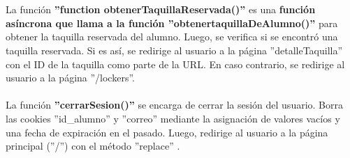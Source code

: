 \documentclass[12pt]{report}
\begin{document}
\\\\
La función \textbf{''function obtenerTaquillaReservada()''} es una \textbf{función asíncrona que llama a la función ''obtenertaquillaDeAlumno()''} para obtener la taquilla reservada del alumno. Luego, se verifica si se encontró una taquilla reservada. Si es así, se redirige al usuario a la página ''detalleTaquilla'' con el ID de la taquilla como parte de la URL. En caso contrario, se redirige al usuario a la página ''/lockers''.
\\\\
La función \textbf{''cerrarSesion()''} se encarga de cerrar la sesión del usuario. Borra las cookies ''id\_alumno'' y ''correo'' mediante la asignación de valores vacíos y una fecha de expiración en el pasado. Luego, redirige al usuario a la página principal (''/'') con el método ''replace'' .
\end{document}
